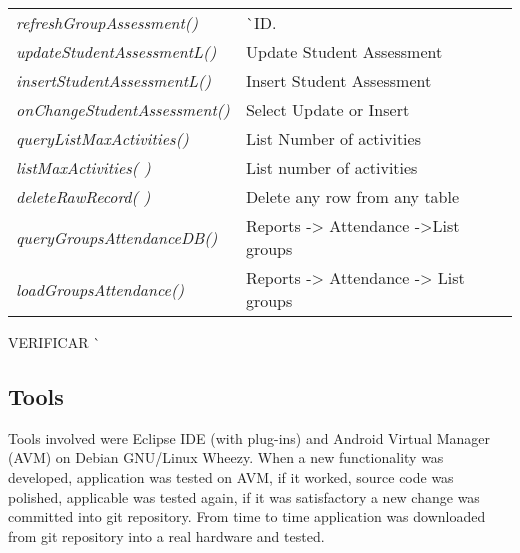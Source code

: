 \begin{bclogo}[couleur=orange!30,logo=\bcbook, arrondi=0.1,ombre=true ]
\begin{tabular}{lll}
\emph { refreshGroupAssessment()}       & { ^^ ID.} \\
\emph { updateStudentAssessmentL() }    & {  Update Student Assessment} \\
\emph { insertStudentAssessmentL() }    &{ Insert Student Assessment   }\\
\emph { onChangeStudentAssessment() }   & { Select Update or Insert  } \\
\emph { queryListMaxActivities() }      &{ List Number of activities } \\
\emph { listMaxActivities( ) }          &{ List number of activities } \\
\emph { deleteRawRecord( ) }            & { Delete any row from any table } \\
\emph { queryGroupsAttendanceDB() }     & Reports -> Attendance ->List  groups \\
\emph { loadGroupsAttendance()}         &{ Reports -> Attendance -> List  groups  } \\


\end{tabular}
\end{bclogo}  
{\huge  VERIFICAR ^^ }

  
		\subsection{Tools}
	
	Tools involved were Eclipse IDE (with plug-ins) and Android Virtual Manager (AVM) on Debian GNU/Linux Wheezy. When a new functionality was developed, application was tested on AVM,  if it worked, source code was polished, applicable was tested again, if it was satisfactory a new change was committed into git repository. From time to time application was downloaded from git repository into a real hardware and tested. 
	
